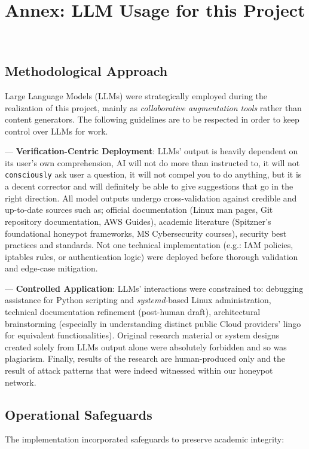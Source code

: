 \newpage

\newpage 


\section{Annex: LLM Usage for this Project}  
\label{annex:llm}  
\
\


\subsection*{Methodological Approach}
Large Language Models (LLMs) were strategically employed during the realization of this project, mainly as \emph{collaborative augmentation tools} rather than content generators. The following guidelines are to be respected in order to keep control over LLMs for work.

--- \textbf{Verification-Centric Deployment}: LLMs' output is heavily dependent on its user's own comprehension, AI will not do more than instructed to, it will not \texttt{consciously} ask user a question, it will not compel you to do anything, but it is a decent corrector and will definitely be able to give suggestions that go in the right direction. All model outputs undergo cross-validation against credible and up-to-date sources such as; official documentation (Linux man pages, Git repository documentation, AWS Guides), academic literature (Spitzner's foundational honeypot frameworks, MS Cybersecurity courses), security best practices and standards. Not one technical implementation (e.g.: IAM policies, iptables rules, or authentication logic) were deployed before thorough validation and edge-case mitigation.

--- \textbf{Controlled Application}: LLMs' interactions were constrained to: debugging assistance for Python scripting and \textit{systemd}-based Linux administration, technical documentation refinement (post-human draft), architectural brainstorming (especially in understanding distinct public Cloud providers' lingo for equivalent functionalities). Original research material or system designs created solely from LLMs output alone were absolutely forbidden and so was plagiarism. Finally, results of the research are human-produced only and the result of attack patterns that were indeed witnessed within our honeypot network.

\subsection*{Operational Safeguards}
The implementation incorporated safeguards to preserve academic integrity:

